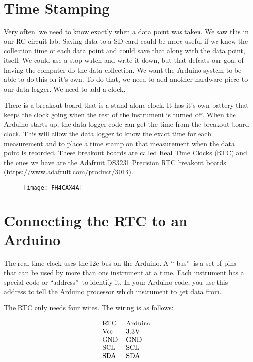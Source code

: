 \section{Time Stamping}

Very often, we need to know exactly when a data point was taken. We saw this
in our RC circuit lab. Saving data to a SD card could be more useful if we
knew the collection time of each data point and could save that along with
the data point, itself. We could use a stop watch and write it down, but
that defeats our goal of having the computer do the data collection. We want
the Arduino system to be able to do this on it's own. To do that, we need to
add another hardware piece to our data logger. We need to add a clock.

There is a breakout board that is a stand-alone clock. It has it's own
battery that keeps the clock going when the rest of the instrument is turned
off. When the Arduino starts up, the data logger code can get the time from
the breakout board clock. This will allow the data logger to know the exact
time for each measurement and to place a time stamp on that measurement when
the data point is recorded. These breakout boards are called Real Time
Clocks (RTC) and the ones we have are the Adafruit DS3231 Precision RTC
breakout boards (https://www.adafruit.com/product/3013).\begin{figure}[h!]
\texttt{[image: PH4CAX4A]}
\end{figure}

\section{Connecting the RTC to an Arduino}

The real time clock uses the I2c bus on the Arduino. A \textquotedblleft
bus\textquotedblright\ is a set of pins that can be used by more than one
instrument at a time. Each instrument has a special code or
\textquotedblleft address\textquotedblright\ to identify it. In your Arduino
code, you use this address to tell the Arduino processor which instrument to
get data from.

The RTC only needs four wires. The wiring is as follows:

\begin{equation*}
\begin{tabular}{ll}
RTC & Arduino \\ 
Vcc & 3.3V \\ 
GND & GND \\ 
SCL & SCL \\ 
SDA & SDA%
\end{tabular}%
\end{equation*}

